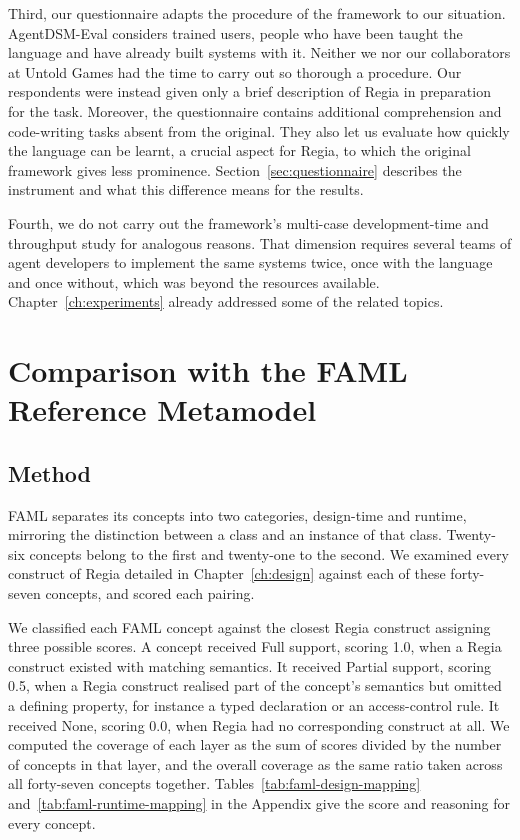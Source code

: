 Third, our questionnaire adapts the procedure of the framework to our situation. AgentDSM-Eval considers trained users, people who have been taught the language and have already built systems with it. Neither we nor our collaborators at Untold Games had the time to carry out so thorough a procedure. Our respondents were instead given only a brief description of Regia in preparation for the task. Moreover, the questionnaire contains additional comprehension and code-writing tasks absent from the original. They also let us evaluate how quickly the language can be learnt, a crucial aspect for Regia, to which the original framework gives less prominence. Section~\ref{sec:questionnaire} describes the instrument and what this difference means for the results.
 
Fourth, we do not carry out the framework's multi-case development-time and throughput study for analogous reasons. That dimension requires several teams of agent developers to implement the same systems twice, once with the language and once without, which was beyond the resources available. Chapter~\ref{ch:experiments} already addressed some of the related topics.

\section{Comparison with the FAML Reference Metamodel}
\label{sec:faml-comparison}
 
\subsection{Method}
\label{sec:faml-comparison-method}
 
FAML separates its concepts into two categories, design-time and runtime, mirroring the distinction between a class and an instance of that class. Twenty-six concepts belong to the first and twenty-one to the second. We examined every construct of Regia detailed in Chapter~\ref{ch:design} against each of these forty-seven concepts, and scored each pairing.
 
We classified each FAML concept against the closest Regia construct assigning three possible scores. A concept received Full support, scoring 1.0, when a Regia construct existed with matching semantics. It received Partial support, scoring 0.5, when a Regia construct realised part of the concept's semantics but omitted a defining property, for instance a typed declaration or an access-control rule. It received None, scoring 0.0, when Regia had no corresponding construct at all. We computed the coverage of each layer as the sum of scores divided by the number of concepts in that layer, and the overall coverage as the same ratio taken across all forty-seven concepts together. Tables~\ref{tab:faml-design-mapping} and~\ref{tab:faml-runtime-mapping} in the Appendix give the score and reasoning for every concept.
 
